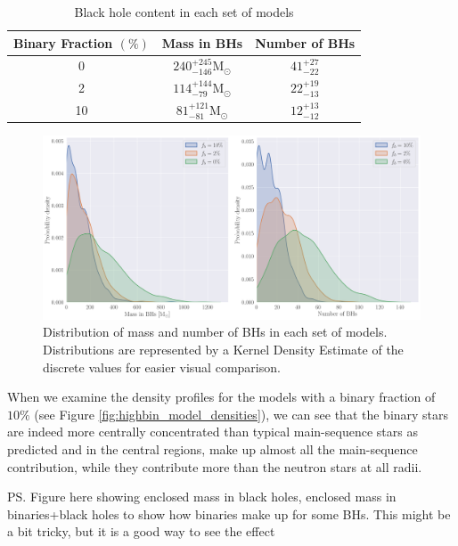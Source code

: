 \begin{table}
	\centering
	\caption{Black hole content in each set of models}
	\begin{tabular}{c c c}
		\hline
		Binary Fraction $(\%)$ & Mass in BHs                          & Number of BHs    \\
		\hline
		0                      & $240^{+245}_{-146} \mathrm{M}_\odot$ & $41^{+27}_{-22}$ \\
		2                      & $114^{+144}_{-79} \mathrm{M}_\odot$  & $22^{+19}_{-13}$ \\
		10                     & $81 ^{+121}_{-81} \mathrm{M}_\odot$  & $12^{+13}_{-12}$ \\
		\hline
	\end{tabular}
	\label{tab:BH_contents}
\end{table}


\begin{figure}
	\centering
	\includegraphics[width=\textwidth]{figures/BH_KDEs.png}
	\caption{Distribution of mass and number of BHs in each set of models. Distributions are
	 represented by a Kernel Density Estimate of the discrete values for easier visual
	 comparison.}
	\label{fig:BH_KDEs}
\end{figure}

When we examine the density profiles for the models with a binary fraction of $10\%$ (see Figure
\ref{fig:highbin_model_densities}), we can see that the binary stars are indeed more centrally
concentrated than typical main-sequence stars as predicted and in the central regions, make up
almost all the main-sequence contribution, while they contribute more than the neutron stars at all
radii.

\ps{Figure here showing enclosed mass in black holes, enclosed mass in binaries+black holes to show
	how binaries make up for some BHs. This might be a bit tricky, but it is a good way to see
	the effect}


